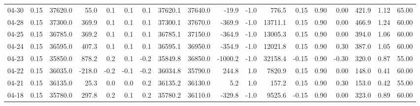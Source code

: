 \begin{threeparttable}
{\begin{tabular}{lrrrrrrrrrrrrrrrrr}
  04-30 &     0.15 & 37620.0 &              55.0 &               0.1 &                0.1 &                0.1 & 37620.1 & 37640.0 &      -19.9 &                     -1.0 &               776.5 &       0.15 &      0.90 &           0.00 &            421.9 &            1.12 &                  65.00 \\
  04-28 &     0.15 & 37300.0 &             369.9 &               0.1 &                0.1 &                0.1 & 37300.1 & 37670.0 &     -369.9 &                     -1.0 &             13711.1 &       0.15 &      0.90 &           0.00 &            466.9 &            1.24 &                  60.00 \\
  04-25 &     0.15 & 36785.0 &             369.2 &               0.1 &                0.1 &                0.1 & 36785.1 & 37150.0 &     -364.9 &                     -1.0 &             13005.3 &       0.15 &      0.90 &           0.00 &            394.0 &            1.06 &                  60.00 \\
  04-24 &     0.15 & 36595.0 &             407.3 &               0.1 &                0.1 &                0.1 & 36595.1 & 36950.0 &     -354.9 &                     -1.0 &             12021.8 &       0.15 &      0.90 &           0.30 &            387.0 &            1.05 &                  60.00 \\
  04-23 &     0.15 & 35850.0 &             878.2 &               0.2 &                0.1 &               -0.2 & 35849.8 & 36850.0 &    -1000.2 &                     -1.0 &             32158.4 &      -0.15 &      0.90 &          -0.30 &            320.0 &            0.87 &                  55.00 \\
  04-22 &     0.15 & 36035.0 &            -218.0 &              -0.2 &               -0.1 &               -0.2 & 36034.8 & 35790.0 &      244.8 &                      1.0 &              7820.9 &       0.15 &      0.90 &           0.00 &            148.0 &            0.41 &                  60.00 \\
  04-21 &     0.15 & 36135.0 &              25.3 &               0.0 &                0.0 &                0.2 & 36135.2 & 36130.0 &        5.2 &                      1.0 &               157.2 &       0.15 &      0.90 &           0.30 &            153.0 &            0.42 &                  55.00 \\
  04-18 &     0.15 & 35780.0 &             297.8 &               0.2 &                0.1 &                0.2 & 35780.2 & 36110.0 &     -329.8 &                     -1.0 &              9525.6 &      -0.15 &      0.90 &           0.00 &            323.0 &            0.89 &                  60.00 \\

\end{tabular}}
\end{threeparttable}
